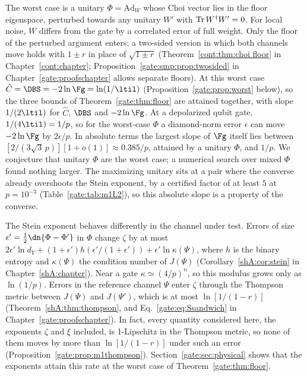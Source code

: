 The worst case is a unitary $\Phi=\mathrm{Ad}_W$ whose Choi vector lies in the floor eigenspace, perturbed towards any unitary $W'$ with $\operatorname{Tr} W^\dagger W'=0$. For local noise, $W$ differs from the gate by a correlated error of full weight. Only the floor of the perturbed argument enters; a two-sided version in which both channels move holds with $1\pm r$ in place of $\sqrt{1\pm r}$ (Theorem~\ref{cont:thm:choi floor} in Chapter~\ref{cont:chapter}; Proposition~\ref{gate:smp:prop:twosided} in Chapter~\ref{gate:proofschapter} allows separate floors). At this worst case $\hat C=\DBS=-2\ln\Fg=\ln(1/\ltil)$ (Proposition~\ref{gate:prop:worst} below), so the three bounds of Theorem~\ref{gate:thm:floor} are attained together, with slope $1/(2\ltil)$ for $\hat C$, $\DBS$ and $-2\ln\Fg$. At a depolarized qubit gate, $1/(4\ltil)=1/p$, so for the worst-case $\Phi$ a diamond-norm error $\epsilon$ can move $-2\ln\Fg$ by $2\epsilon/p$. In absolute terms the largest slope of $\Fg$ itself lies between $[2/(3\sqrt3\,p)][1+o(1)]\approx0.385/p$, attained by a unitary $\Phi$, and $1/p$. We conjecture that unitary $\Phi$ are the worst case; a numerical search over mixed $\Phi$ found nothing larger. The maximizing unitary sits at a pair where the converse already overshoots the Stein exponent, by a certified factor of at least $5$ at $p=10^{-3}$ (Table~\ref{gate:tab:m1L2}), so this absolute slope is a property of the converse.

The Stein exponent behaves differently in the channel under test. Errors of size $\epsilon'=\frac12\dn{\Phi-\Phi'}$ in $\Phi$ change $\zeta$ by at most $2\epsilon'\ln d_Y+(1+\epsilon')h(\epsilon'/(1+\epsilon'))+\epsilon'\ln\kappa(\Psi)$, where $h$ is the binary entropy and $\kappa(\Psi)$ the condition number of $J(\Psi)$ (Corollary~\ref{shA:cor:stein} in Chapter~\ref{shA:chapter}). Near a gate $\kappa\simeq(4/p)^n$, so this modulus grows only as $\ln(1/p)$. Errors in the reference channel $\Psi$ enter $\zeta$ through the Thompson metric between $J(\Psi)$ and $J(\Psi')$, which is at most $\ln[1/(1-r)]$~\cite{Thompson1963} (Theorem~\ref{shA:thm:thompson}, and Eq.~\eqref{gate:eq:Ssandwich} in Chapter~\ref{gate:proofschapter}). In fact, every quantity considered here, the exponents $\zeta$ and $\xi$ included, is 1-Lipschitz in the Thompson metric, so none of them moves by more than $\ln[1/(1-r)]$ under such an error (Proposition~\ref{gate:prop:m1thompson}). Section~\ref{gate:sec:physical} shows that the exponents attain this rate at the worst case of Theorem~\ref{gate:thm:floor}.

